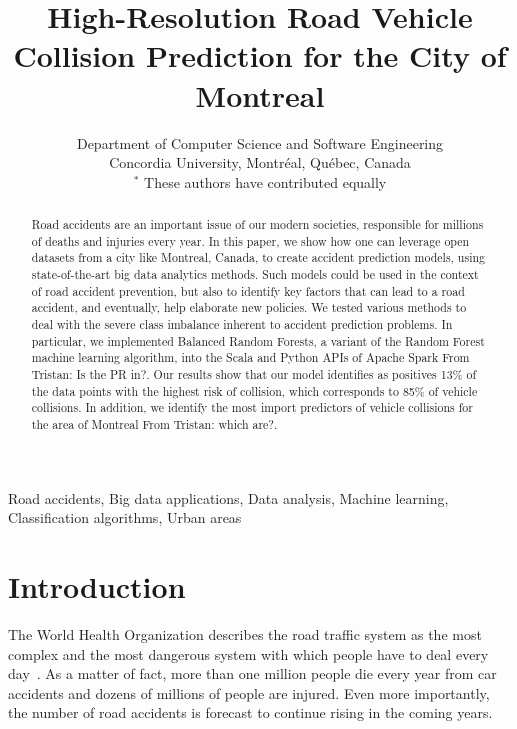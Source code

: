 \documentclass[conference]{IEEEtran}
\newcommand{\TG}[1]{\colorlet{saved}{.}\color{orange}From Tristan: #1\color{saved}}
\begin{document}
\title{High-Resolution Road Vehicle Collision Prediction for the City of Montreal}
\author{
Department of Computer Science and Software Engineering \\
Concordia University, Montréal, Québec, Canada\\
$^*$ These authors have contributed equally

}

\maketitle

\begin{abstract}

Road accidents are an important issue of our modern societies, responsible
for millions of deaths and injuries every year. 
In this paper, we show how one can leverage open datasets from a city like
Montreal, Canada, to create accident prediction models, using state-of-the-art
big data analytics methods.
Such models could be used in the context of road accident prevention, but also
to identify key factors that can lead to a road accident, and eventually, help
elaborate new policies.
We tested various methods to deal with the severe class imbalance inherent
to accident prediction problems. In particular, we implemented Balanced Random Forests, a variant
of the Random Forest machine learning algorithm, into the Scala and Python
APIs of Apache Spark \TG{Is the PR in?}.
Our results show that our model identifies as positives 13\% of the data
points with the highest risk of collision, which corresponds to 85\% of 
vehicle collisions.
In addition, we identify the most import predictors of vehicle collisions for the area of Montreal \TG{which are?}.

\end{abstract}

\begin{IEEEkeywords}
Road accidents, Big data applications, Data analysis, Machine learning, Classification algorithms, Urban areas
\end{IEEEkeywords}

\section{Introduction}

The World Health Organization describes the road traffic system as the most
complex and the most dangerous system with which people have to deal every
day~\cite{Peden2004}. As a matter of fact, more than one million people
die every year from car accidents and dozens of millions of people are
injured. Even more importantly, the number of road accidents is forecast to
continue rising in the coming years.
\end{document}

